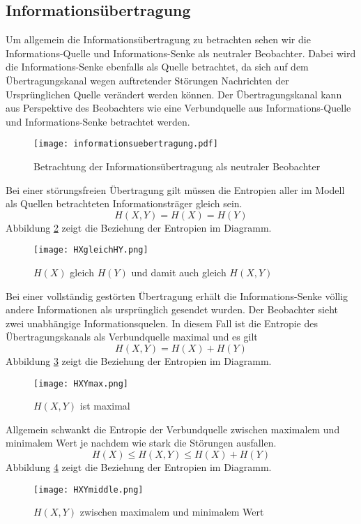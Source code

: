 \subsection{Informationsübertragung}
Um allgemein die Informationsübertragung zu betrachten sehen wir die Informations-Quelle und Informations-Senke als neutraler Beobachter. Dabei wird die Informations-Senke ebenfalls als Quelle betrachtet, da sich auf dem Übertragungskanal wegen auftretender Störungen Nachrichten der Ursprünglichen Quelle verändert werden können. Der Übertragungskanal kann aus Perspektive des Beobachters wie eine Verbundquelle aus Informations-Quelle und Informations-Senke betrachtet werden.
\begin{figure}[htbp] %
	\centering
	\texttt{[image: informationsuebertragung.pdf]}
	\caption{Betrachtung der Informationsübertragung als neutraler Beobachter}
	\label{iübertragung}
\end{figure}

Bei einer störungsfreien Übertragung gilt müssen die Entropien aller im Modell als Quellen betrachteten Informationsträger gleich sein. 
$$H(X,Y) = H(X) = H(Y)$$
Abbildung \ref{hxEQhy} zeigt die Beziehung der Entropien im Diagramm.

\begin{figure}[htbp] %
	\centering
	\texttt{[image: HXgleichHY.png]}
	\caption{$H(X)$ gleich $H(Y)$ und damit auch gleich $H(X,Y)$}
	\label{hxEQhy}
\end{figure}

Bei einer vollständig gestörten Übertragung erhält die Informations-Senke völlig andere Informationen als ursprünglich gesendet wurden. Der Beobachter sieht zwei unabhängige Informationsquelen. In diesem Fall ist die Entropie des Übertragungskanals als Verbundquelle maximal und es gilt
$$H(X,Y) = H(X) + H(Y)$$
Abbildung \ref{hxymax} zeigt die Beziehung der Entropien im Diagramm.

\begin{figure}[htbp] %
	\centering
	\texttt{[image: HXYmax.png]}
	\caption{$H(X,Y)$ ist maximal}
	\label{hxymax}
\end{figure}

Allgemein schwankt die Entropie der Verbundquelle zwischen maximalem und minimalem Wert je nachdem wie stark die Störungen ausfallen.
$$ H(X) \le H(X,Y) \le H(X) + H(Y) $$
Abbildung \ref{hxymid} zeigt die Beziehung der Entropien im Diagramm.
\begin{figure}[htbp] %
	\centering
	\texttt{[image: HXYmiddle.png]}
	\caption{$H(X,Y)$ zwischen maximalem und minimalem Wert}
	\label{hxymid}
\end{figure}

